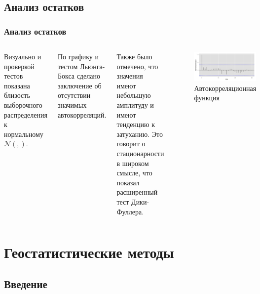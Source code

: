 \documentclass[10pt,pdf,aspectratio=169,hyperref={unicode}]{beamer}
\newcommand{\inp}[1]{}
\newcommand{\descriptive}[2]{\inp{#1/descriptive/#2}}
\newcommand{\resnormaldistr}{$\mathcal{N}(\descriptive{residual}{mean}, \descriptive{residual}{variance})$}
\begin{document}
\subsection{Анализ остатков}
\begin{frame}
  \frametitle{Анализ остатков}
  \begin{columns}[c]
  \column{2.5in}
    Визуально и проверкой тестов показана близость выборочного распределения к нормальному \resnormaldistr.

    \vspace{0.5em}

    По графику и тестом Льюнга-Бокса сделано заключение об отсутствии значимых автокорреляций.

    \vspace{0.5em}

    Также было отмечено, что значения имеют небольшую амплитуду и имеют тенденцию к затуханию. Это говорит о стационарности в широком смысле, что показал расширенный тест Дики-Фуллера.
  \column{3.5in}
    \begin{figure}[h]
    \includegraphics[width=1\linewidth]{../../figures/residual/acf.png}
    \caption{Автокорреляционная функция}
  \end{figure}
  \end{columns}
\end{frame}

\section{Геостатистические методы}

\subsection{Введение}
\end{document}
